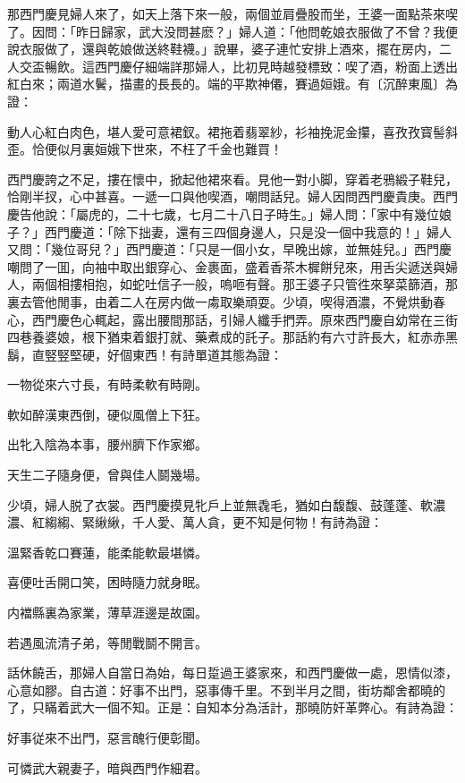 那西門慶見婦人來了，如天上落下來一般，兩個並肩疊股而坐，王婆一面點茶來喫了。因問：「昨日歸家，武大没問甚麽？」婦人道：「他問乾娘衣服做了不曾？我便說衣服做了，還與乾娘做送終鞋襪。」說畢，婆子連忙安排上酒來，擺在房内，二人交盃暢飲。這西門慶仔細端詳那婦人，比初見時越發標致：喫了酒，粉面上透出紅白來；兩道水鬢，描畫的長長的。端的平欺神僊，賽過姮娥。有〔沉醉東風〕為證：

\begin{myquote}
動人心紅白肉色，堪人愛可意裙釵。裙拖着翡翠紗，衫袖挽泥金攥，喜孜孜寳髻斜歪。恰便似月裏姮娥下世來，不枉了千金也難買！
\end{myquote}

西門慶誇之不足，摟在懷中，掀起他裙來看。見他一對小脚，穿着老鴉緞子鞋兒，恰剛半扠，心中甚喜。一遞一口與他喫酒，嘲問話兒。婦人因問西門慶貴庚。西門慶告他說：「屬虎的，二十七歲，七月二十八日子時生。」婦人問：「家中有幾位娘子？」西門慶道：「除下拙妻，還有三四個身邊人，只是没一個中我意的！」婦人又問：「幾位哥兒？」西門慶道：「只是一個小女，早晚出嫁，並無娃兒。」西門慶嘲問了一囬，向袖中取出銀穿心、金裹面，盛着香茶木樨餅兒來，用舌尖遞送與婦人，兩個相摟相抱，如蛇吐信子一般，嗚咂有聲。那王婆子只管徃來拏菜篩酒，那裏去管他閒事，由着二人在房内做一䖏取樂頑耍。少頃，喫得酒濃，不覺烘動春心，西門慶色心輒起，露出腰間那話，引婦人纖手捫弄。原來西門慶自幼常在三街四巷養婆娘，根下猶束着銀打就、藥煮成的託子。那話約有六寸許長大，紅赤赤黑鬍，直竪竪堅硬，好個東西！有詩單道其態為證：

\begin{myquote}
一物從來六寸長，有時柔軟有時剛。

軟如醉漢東西倒，硬似風僧上下狂。

出牝入陰為本事，腰州臍下作家鄉。

天生二子隨身便，曾與佳人鬬幾場。
\end{myquote}

少頃，婦人脱了衣裳。西門慶摸見牝戶上並無毳毛，猶如白馥馥、鼓蓬蓬、軟濃濃、紅縐縐、緊䋺䋺，千人愛、萬人貪，更不知是何物！有詩為證：
\begin{myquote}
溫緊香乾口賽蓮，能柔能軟最堪憐。

喜便吐舌開口笑，困時隨力就身眠。

内襠縣裏為家業，薄草涯邊是故園。

若遇風流清子弟，等閒戰鬬不開言。
\end{myquote}

話休饒舌，那婦人自當日為始，每日踅過王婆家來，和西門慶做一處，恩情似漆，心意如膠。自古道：好事不出門，惡事傳千里。不到半月之間，街坊鄰舍都曉的了，只瞞着武大一個不知。正是：自知本分為活計，那曉防奸革弊心。有詩為證：
\begin{myquote}
好事従來不出門，惡言醜行便彰聞。

可憐武大親妻子，暗與西門作細君。
\end{myquote}

